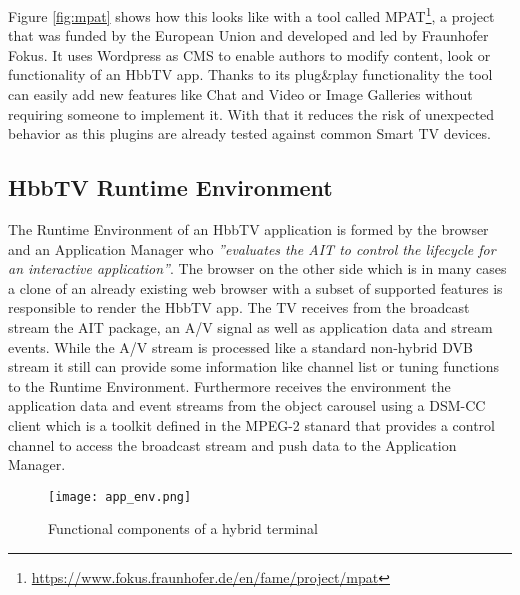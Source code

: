 Figure \ref{fig:mpat} shows how this looks like with a tool called MPAT\footnote{\url{https://www.fokus.fraunhofer.de/en/fame/project/mpat}},
a project that was funded by the European Union and developed and led by Fraunhofer Fokus.
It uses Wordpress as CMS to enable authors to modify content, look or functionality of an HbbTV
app. Thanks to its plug\&play functionality the tool can easily add new features like Chat and Video or
Image Galleries without requiring someone to implement it. With that it reduces the risk of unexpected
behavior as this plugins are already tested against common Smart TV devices.

\subsection{HbbTV Runtime Environment\label{sec:hbbtvruntimeenvironment}}

The Runtime Environment of an HbbTV application is formed by the browser and an Application Manager who
\textit{''evaluates the AIT to control the lifecycle for an interactive application''}\cite{hbbtv15}.
The browser on the other side which is in many cases a clone of an already existing web browser with
a subset of supported features is responsible to render the HbbTV app. The TV receives from the broadcast
stream the AIT package, an A/V signal as well as application data and stream events. While the A/V
stream is processed like a standard non-hybrid DVB stream it still can provide some information like
channel list or tuning functions to the Runtime Environment. Furthermore receives the environment
the application data and event streams from the object carousel using a DSM-CC client which is a
toolkit defined in the MPEG-2 stanard that provides a control channel to access the broadcast stream
and push data to the Application Manager.

\begin{figure}[htb]
  \centering
  \texttt{[image: app\_env.png]}\\
  \caption{
    Functional components of a hybrid terminal
  }
  \label{fig:app_env}
\end{figure}

